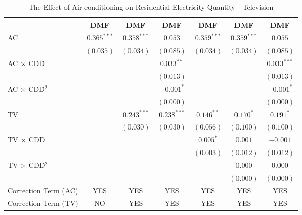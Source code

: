 
\begin{table}[htbp]
\caption{The Effect of Air-conditioning on Residential Electricity Quantity - Television}
\begin{center}
\begin{tabular}{l c c c c c c}
\hline
 & DMF & DMF & DMF & DMF & DMF & DMF \\
\hline
AC                      & $0.365^{***}$ & $0.358^{***}$ & $0.053$       & $0.359^{***}$ & $0.359^{***}$ & $0.055$       \\
                        & $(0.035)$     & $(0.034)$     & $(0.085)$     & $(0.034)$     & $(0.034)$     & $(0.085)$     \\
AC $\times$ CDD         &               &               & $0.033^{**}$  &               &               & $0.033^{***}$ \\
                        &               &               & $(0.013)$     &               &               & $(0.013)$     \\
AC $\times$ CDD$^2$     &               &               & $-0.001^{*}$  &               &               & $-0.001^{*}$  \\
                        &               &               & $(0.000)$     &               &               & $(0.000)$     \\
TV                      &               & $0.243^{***}$ & $0.238^{***}$ & $0.146^{**}$  & $0.170^{*}$   & $0.191^{*}$   \\
                        &               & $(0.030)$     & $(0.030)$     & $(0.056)$     & $(0.100)$     & $(0.100)$     \\
TV $\times$ CDD         &               &               &               & $0.005^{*}$   & $0.001$       & $-0.001$      \\
                        &               &               &               & $(0.003)$     & $(0.012)$     & $(0.012)$     \\
TV $\times$ CDD$^2$     &               &               &               &               & $0.000$       & $0.000$       \\
                        &               &               &               &               & $(0.000)$     & $(0.000)$     \\
\hline
Correction Term (AC)    & YES           & YES           & YES           & YES           & YES           & YES           \\
Correction Term (TV)    & NO            & YES           & YES           & YES           & YES           & YES           \\

\end{tabular}
\end{center}
\end{table}

